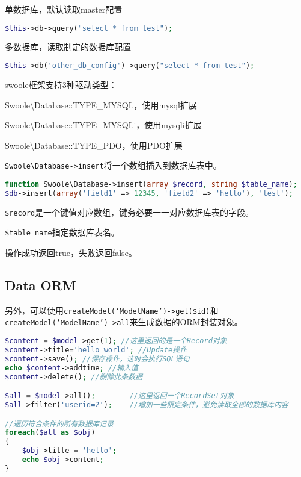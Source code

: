 \begin{compactitem}
\item 单数据库，默认读取master配置

\begin{lstlisting}[language=PHP]
$this->db->query("select * from test");
\end{lstlisting}

\item 多数据库，读取制定的数据库配置

\begin{lstlisting}[language=PHP]
$this->db('other_db_config')->query("select * from test");
\end{lstlisting}
\end{compactitem}

swoole框架支持3种驱动类型：

\begin{compactenum}
\item Swoole\textbackslash Database::TYPE\_MYSQL，使用mysql扩展
\item Swoole\textbackslash Database::TYPE\_MYSQLi，使用mysqli扩展
\item Swoole\textbackslash Database::TYPE\_PDO，使用PDO扩展
\end{compactenum}

\texttt{Swoole\textbackslash Database->insert}将一个数组插入到数据库表中。


\begin{lstlisting}[language=PHP]
function Swoole\Database->insert(array $record, string $table_name);
$db->insert(array('field1' => 12345, 'field2' => 'hello'), 'test');
\end{lstlisting}

\begin{compactitem}
\item \texttt{\$record}是一个键值对应数组，键务必要一一对应数据库表的字段。
\item \texttt{\$table\_name}指定数据库表名。
\item 操作成功返回true，失败返回false。
\end{compactitem}

\subsection{Data ORM}


另外，可以使用\texttt{createModel('ModelName')->get(\$id)}和\texttt{createModel('ModelName')->all}来生成数据的ORM封装对象。


\begin{lstlisting}[language=PHP]
$content = $model->get(1); //这里返回的是一个Record对象
$content->title='hello world'; //Update操作
$content->save(); //保存操作，这时会执行SQL语句
echo $content->addtime; //输入值
$content->delete(); //删除此条数据

$all = $model->all();        //这里返回一个RecordSet对象
$all->filter('userid=2');    //增加一些限定条件，避免读取全部的数据库内容

//遍历符合条件的所有数据库记录
foreach($all as $obj)
{
    $obj->title = 'hello';
    echo $obj->content;
}
\end{lstlisting}


